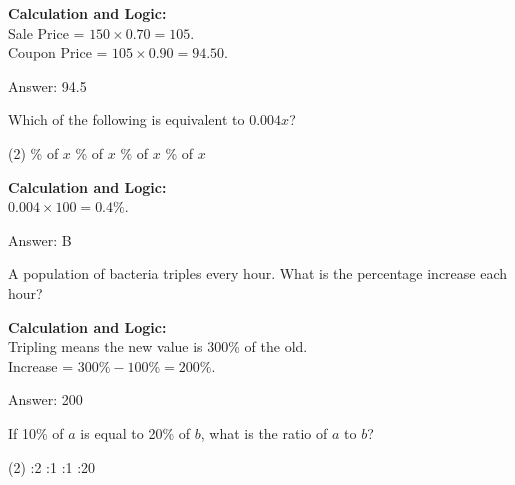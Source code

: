 \documentclass[11pt,paper=a4,answers]{exam}
\begin{document}
\begin{questions}
\begin{solution}
\textbf{Calculation and Logic:} \\
Sale Price = $150 \times 0.70 = 105$. \\
Coupon Price = $105 \times 0.90 = 94.50$.

\vspace{30pt}

Answer: \colorbox{yellow!100}{94.5}
\end{solution}

\vspace{60pt}

\question
Which of the following is equivalent to $0.004x$?
\begin{tasks}(2)
    \% of $x$
    \% of $x$
    \% of $x$
    \% of $x$
\end{tasks}

\begin{solution}
\textbf{Calculation and Logic:} \\
$0.004 \times 100 = 0.4\%$.

\vspace{30pt}

Answer: \colorbox{yellow!100}{B}
\end{solution}

\vspace{60pt}

\question
A population of bacteria triples every hour. What is the percentage increase each hour?

\begin{solution}
\textbf{Calculation and Logic:} \\
Tripling means the new value is 300\% of the old. \\
Increase = $300\% - 100\% = 200\%$.

\vspace{30pt}

Answer: \colorbox{yellow!100}{200}
\end{solution}

\vspace{60pt}

\question
If 10\% of $a$ is equal to 20\% of $b$, what is the ratio of $a$ to $b$?
\begin{tasks}(2)
    :2
    :1
    :1
    :20
\end{tasks}


\end{questions}
\end{document}
